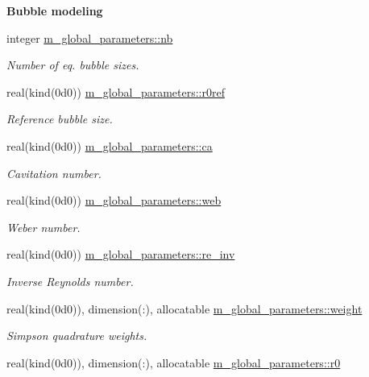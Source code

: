 \begin{Indent}\textbf{ Bubble modeling}\par
\begin{DoxyCompactItemize}
\item 
integer \hyperlink{namespacem__global__parameters_ad76c4758994b52559f478d251dc0cba5}{m\+\_\+global\+\_\+parameters\+::nb}
\begin{DoxyCompactList}\small\item\em Number of eq. bubble sizes. \end{DoxyCompactList}\item 
real(kind(0d0)) \hyperlink{namespacem__global__parameters_a24492f9b474683476a342e7ee42c1c6d}{m\+\_\+global\+\_\+parameters\+::r0ref}
\begin{DoxyCompactList}\small\item\em Reference bubble size. \end{DoxyCompactList}\item 
real(kind(0d0)) \hyperlink{namespacem__global__parameters_a1fcd6cc13ad7f604ef81708716a1feac}{m\+\_\+global\+\_\+parameters\+::ca}
\begin{DoxyCompactList}\small\item\em Cavitation number. \end{DoxyCompactList}\item 
real(kind(0d0)) \hyperlink{namespacem__global__parameters_af2ed21959a90158c2459574230cdfcff}{m\+\_\+global\+\_\+parameters\+::web}
\begin{DoxyCompactList}\small\item\em Weber number. \end{DoxyCompactList}\item 
real(kind(0d0)) \hyperlink{namespacem__global__parameters_a4438313a11564fa911c586d2dee15b8d}{m\+\_\+global\+\_\+parameters\+::re\+\_\+inv}
\begin{DoxyCompactList}\small\item\em Inverse Reynolds number. \end{DoxyCompactList}\item 
real(kind(0d0)), dimension(\+:), allocatable \hyperlink{namespacem__global__parameters_a121ed97f0ae913d37bce5bbf1c7b2cc2}{m\+\_\+global\+\_\+parameters\+::weight}
\begin{DoxyCompactList}\small\item\em Simpson quadrature weights. \end{DoxyCompactList}\item 
real(kind(0d0)), dimension(\+:), allocatable \hyperlink{namespacem__global__parameters_a585a72037bbffe12e8d4512a57f52418}{m\+\_\+global\+\_\+parameters\+::r0}

\end{DoxyCompactItemize}
\end{Indent}
